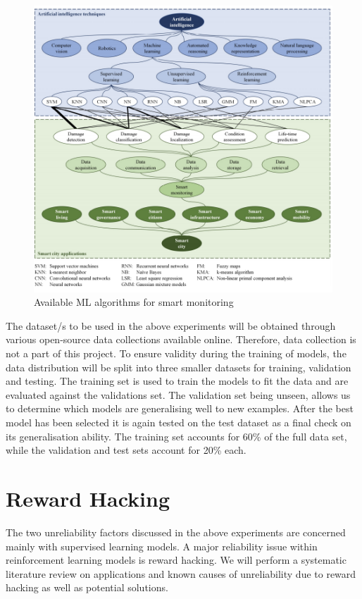 \documentclass[a4paper,12pt]{report}
\begin{document}
\begin{figure}[H]
    \centering
    \includegraphics[width=\textwidth]{smart_monitoring_algorithms.png}
    \caption{Available ML algorithms for smart monitoring \cite{inproceedings}}
    \label{fig:algor}
\end{figure}

\enlargethispage{\baselineskip}
The dataset/s to be used in the above experiments will be obtained through various open-source data collections available online. 
Therefore, data collection is not a part of this project.
To ensure validity during the training of models, the data distribution will be split into three smaller datasets for training, validation and testing. 
The training set is used to train the models to fit the data and are evaluated against the validations set. 
The validation set being unseen, allows us to determine which models are generalising well to new examples. 
After the best model has been selected it is again tested on the test dataset as a final check on its generalisation ability. 
The training set accounts for 60\% of the full data set, while the validation and test sets account for 20\% each. 

\section{Reward Hacking}
The two unreliability factors discussed in the above experiments are concerned mainly with supervised learning models. 
A major reliability issue within reinforcement learning models is reward hacking. 
We will perform a systematic literature review on applications and known causes of unreliability due to reward hacking as well as potential solutions.
\end{document}
